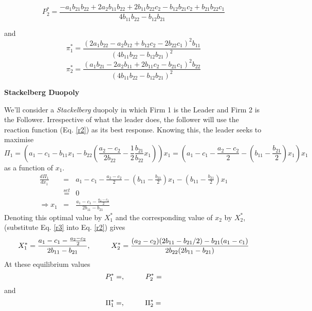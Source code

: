 \documentclass[a4paper,12pt]{article}
\begin{document}
$$P^*_2  = \frac{-a_1b_{21} b_{22} + 2a_2 b_{11} b_{22} +2 b_{11} b_{22} c_2
  -  b_{12} b_{21} c_2 + b_{21} b_{22} c_1}{4 b_{11} b_{22} - b_{12} b_{21}}$$

and
 \begin{equation} \pi_1^* =\frac{ (2a_1b_{22}-a_2b_{12}+b_{12}c_2-2b_{22}c_1)^2b_{11}}{(4b_{11}b_{22}-b_{12}b_{21})^2} \label{cp1} \end{equation}
  \begin{equation} \pi_2^* = \frac{(a_1b_{21}-2a_2b_{11}+2b_{11}c_2-b_{21}c_1)^2b_{22}}{(4b_{11}b_{22}-b_{12}b_{21})^2} \label{cp2} \end{equation}


 \begin{center}
\textbf{Stackelberg Duopoly %
}
\end{center}
We'll consider a \textit{Stackelberg} duopoly in which Firm 1 is the Leader and Firm 2 is the Follower. Irrespective of what the leader does, the follower will use the reaction function (Eq. \ref{r2}) as its best response.
\newpage
Knowing this, the leader seeks to maximise 
\[ \Pi_1 = \left(a_1-c_1 - b_{11}x_1 -b_{22}\left( \frac{a_2-c_2}{2b_{22}} - \frac{1}{2}\frac{b_{21}}{b_{22}} x_1\right)\right) x_1 = \left( a_1 - c_1 - \frac{a_2 - c_2}{2} - \left(b_{11} - \frac{b_{21}}{2}\right)x_1\right)x_1\]
as a function of $x_1$.
\begin{eqnarray}
 \frac{d \Pi_1} {d x_1} &=&a_1 - c_1 - \frac{ a_2 - c_2}{2} - \left(b_{11} - \frac{b_{21}}{2}\right)x_1 - \left(b_{11} - \frac{b_{21}}{2}\right)x_1 \nonumber \\
 & \stackrel{set}{=} & 0 \nonumber \\
 \Rightarrow x_1 &=& \frac{a_1 - c_1 - \frac{ a_2 - c_2}{2}}{2b_{11}-b_{21}} \label{r3}
 \end{eqnarray}
 Denoting this optimal value by $X_1^*$ and the corresponding value of $x_2$ by $X_2^*$,(substitute Eq. \ref{r3} into Eq. \ref{r2}) gives
$$ X_1^* = \frac{a_1 - c_1 - \frac{ a_2 - c_2}{2}}{2b_{11}-b_{21}}, \hspace{10mm} X_2^* = \frac{(a_2-c_2)(2b_{11}-b_{21}/2)-b_{21}(a_1-c_1)}{2b_{22}(2b_{11}-b_{21})} $$
At these equilibrium values
$$ P_1^* = , \hspace{10mm} P_2^*= $$
 and
 \begin{equation} \Pi_1^* = , \hspace{10mm} \Pi_2^* = \label{sp} \end{equation}

\newpage
\end{document}
